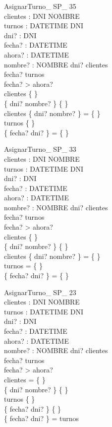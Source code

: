 \documentclass[12pt]{article}
\begin{document}
\begin{schema}{AsignarTurno\_ SP\_ 35}\\
clientes : DNI \pfun NOMBRE \\
turnos : DATETIME \pfun DNI \\
dni? : DNI \\
fecha? : DATETIME \\
ahora? : DATETIME \\
nombre? : NOMBRE
\where
dni? \notin \dom clientes \\
fecha? \notin \dom turnos \\
fecha? > ahora? \\
clientes \neq \{ \} \\
\{ dni? \mapsto nombre? \} \neq \{ \} \\
clientes \cap \{ dni? \mapsto nombre? \} = \{ \} \\
turnos \neq \{ \} \\
\{ fecha? \mapsto dni? \} = \{ \}\end{schema}

\begin{schema}{AsignarTurno\_ SP\_ 33}\\
clientes : DNI \pfun NOMBRE \\
turnos : DATETIME \pfun DNI \\
dni? : DNI \\
fecha? : DATETIME \\
ahora? : DATETIME \\
nombre? : NOMBRE
\where
dni? \notin \dom clientes \\
fecha? \notin \dom turnos \\
fecha? > ahora? \\
clientes \neq \{ \} \\
\{ dni? \mapsto nombre? \} \neq \{ \} \\
clientes \cap \{ dni? \mapsto nombre? \} = \{ \} \\
turnos = \{ \} \\
\{ fecha? \mapsto dni? \} = \{ \}
\end{schema}

\begin{schema}{AsignarTurno\_ SP\_ 23}\\
clientes : DNI \pfun NOMBRE \\
turnos : DATETIME \pfun DNI \\
dni? : DNI \\
fecha? : DATETIME \\
ahora? : DATETIME \\
nombre? : NOMBRE
\where
dni? \notin \dom clientes \\
fecha? \notin \dom turnos \\
fecha? > ahora? \\
clientes = \{ \} \\
\{ dni? \mapsto nombre? \} \neq \{ \} \\
turnos \neq \{ \} \\
\{ fecha? \mapsto dni? \} \neq \{ \} \\
\{ fecha? \mapsto dni? \} = turnos
\end{schema}
\end{document}
